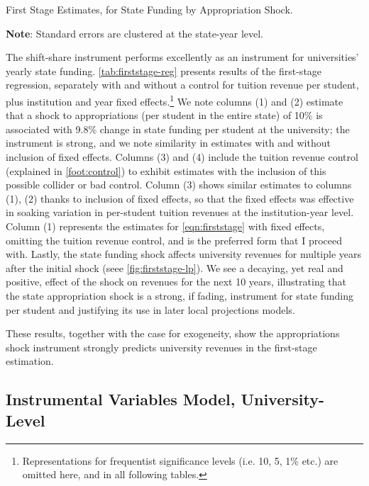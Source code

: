 \begin{table}[h!]
    \singlespacing
    \centering
    \caption{First Stage Estimates, for State Funding by Appropriation Shock.}
    \makebox[\textwidth][c]{}
    \label{tab:firststage-reg}
    \begin{flushleft}
        \footnotesize
        \textbf{Note}: Standard errors are clustered at the state-year level.
    \end{flushleft}
\end{table}

The shift-share instrument performs excellently as an instrument for universities' yearly state funding.
\autoref{tab:firststage-reg} presents results of the first-stage regression, separately with and without a control for tuition revenue per student, plus institution and year fixed effects.\footnote{
    Representations for frequentist significance levels (i.e. 10, 5, 1\% etc.) are omitted here, and in all following tables.
}
We note columns (1) and (2) estimate that a shock to appropriations (per student in the entire state) of 10\% is associated with 9.8\% change in state funding per student at the university; the instrument is strong, and we note similarity in estimates with and without inclusion of fixed effects.
Columns (3) and (4) include the tuition revenue control (explained in \autoref{foot:control}) to exhibit estimates with the inclusion of this possible collider or bad control.
Column (3) shows similar estimates to columns (1), (2) thanks to inclusion of fixed effects, so that the fixed effects was effective in soaking variation in per-student tuition revenues at the institution-year level.
Column (1) represents the estimates for \autoref{eqn:firststage} with fixed effects, omitting the tuition revenue control, and is the preferred form that I proceed with.
Lastly, the state funding shock affects university revenues for multiple years after the initial shock (seee \autoref{fig:firststage-lp}).
We see a decaying, yet real and positive, effect of the shock on revenues for the next 10 years, illustrating that the state appropriation shock is a strong, if fading, instrument for state funding per student and justifying its use in later local projections models.

These results, together with the case for exogeneity, show the appropriations shock instrument strongly predicts university revenues in the first-stage estimation.


\subsection{Instrumental Variables Model, University-Level}
\label{sec:iv-model-uni}

